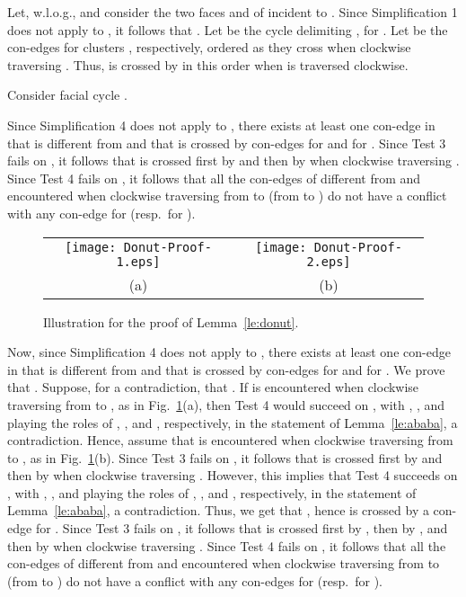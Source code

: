 \documentclass[letter,runningheads]{llncs}
\renewenvironment{proof}
{{\em Proof.\ }}{\hspace*{\fill}\par\vspace{2mm}}
\begin{document}
\begin{proof}
Let, w.l.o.g.,  and consider the two faces  and  of  incident to . Since {\sc Simplification 1} does not apply to , it follows that . Let  be the cycle delimiting , for . Let  be the con-edges for clusters , respectively, ordered as they cross  when clockwise traversing . Thus,  is crossed by  in this order when  is traversed clockwise.

Consider facial cycle .

Since {\sc Simplification 4} does not apply to , there exists at least one con-edge  in  that is different from  and that is crossed by con-edges  for  and  for . Since {\sc Test 3} fails on , it follows that  is crossed first by  and then by  when clockwise traversing . Since {\sc Test 4} fails on , it follows that all the con-edges of  different from  and  encountered when clockwise traversing  from  to  (from  to ) do not have a conflict with any con-edge for  (resp.\ for ).

\begin{figure}[tb]
\begin{center}
\begin{tabular}{c c}
\mbox{\texttt{[image: Donut-Proof-1.eps]}} \hspace{1cm} &
\mbox{\texttt{[image: Donut-Proof-2.eps]}}\\
(a) \hspace{1cm} & (b)
\end{tabular}
\caption{Illustration for the proof of Lemma~\ref{le:donut}.}
\label{fig:donut-proof}
\end{center}
\end{figure}


Now, since {\sc Simplification 4} does not apply to , there exists at least one con-edge  in  that is different from  and that is crossed by con-edges  for  and  for . We prove that . Suppose, for a contradiction, that . If  is encountered when clockwise traversing  from  to , as in Fig.~\ref{fig:donut-proof}(a), then {\sc Test 4} would succeed on , with , , and  playing the roles of , , and , respectively, in the statement of Lemma~\ref{le:ababa}, a contradiction. Hence, assume that  is encountered when clockwise traversing  from  to , as in Fig.~\ref{fig:donut-proof}(b). Since {\sc Test 3} fails on , it follows that  is crossed first by  and then by  when clockwise traversing . However, this implies that {\sc Test 4} succeeds on , with , , and  playing the roles of , , and , respectively, in the statement of Lemma~\ref{le:ababa}, a contradiction. Thus, we get that , hence  is crossed by a con-edge  for . Since {\sc Test 3} fails on , it follows that  is crossed first by , then by , and then by  when clockwise traversing . Since {\sc Test 4} fails on , it follows that all the con-edges of  different from  and  encountered when clockwise traversing  from  to  (from  to ) do not have a conflict with any con-edges for  (resp.\ for ).


\end{proof}
\end{document}
